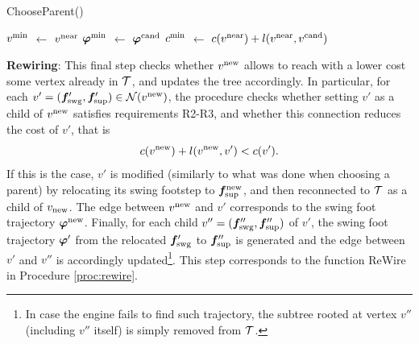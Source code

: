 \begin{procedure}%
	\small
	\removelatexerror
	
	\caption{ChooseParent()}
	\label{proc:chooseparent}

	\vspace{2pt}
    \BlankLine
	
	$v^{\rm min}$ $\leftarrow$ $v^{\rm near}$\;
	${\bm{\varphi}}^{\rm min}$ $\leftarrow$ ${\bm{\varphi}}^{\rm cand}$\;
	$c^{\rm min}$ $\leftarrow$ $c(v^{\rm near}) + l(v^{\rm near}, v^{\rm cand})$\;
	
	\;	
\end{procedure}

{\bf Rewiring}: This final step checks whether $v^{\rm new}$ allows to reach with a lower cost some vertex already in $\cal T$, and updates the tree accordingly. In particular, for each $v' = ({\bm{f}}'_{\rm swg}, {\bm{f}}'_{\rm sup}) \in {\cal N} (v^{\rm new})$, the procedure checks whether setting $v'$ as a child of $v^{\rm new}$ satisfies requirements R2-R3, and whether this connection reduces the cost of $v'$, that is 
\[
c(v^{\rm new}) + l(v^{\rm new}, v') < c(v').
\]
If this is the case, $v'$ is modified (similarly to what was done when choosing a parent) by relocating its swing footstep to ${\bm{f}}_{\rm sup}^{\rm new}$, and then  reconnected to $\cal T$ as a child of $v_{\rm new}$. The edge between $v^{\rm new}$ and $v'$ corresponds to the swing foot trajectory ${\bm{\varphi}}^{\rm new}$.
Finally, for each child $v'' = ({\bm{f}}''_{\rm swg}, {\bm{f}}''_{\rm sup})$ of $v'$, the swing foot trajectory ${\bm{\varphi}}'$ from the relocated ${\bm{f}}'_{\rm swg}$ to ${\bm{f}}''_{\rm sup}$ is generated and the edge between $v'$ and $v''$ is accordingly updated\footnote{In case the engine fails to find such trajectory, the subtree rooted at vertex $v''$ (including $v''$ itself) is simply removed from $\cal T$.}.
This step corresponds to the function ReWire in Procedure \ref{proc:rewire}.

